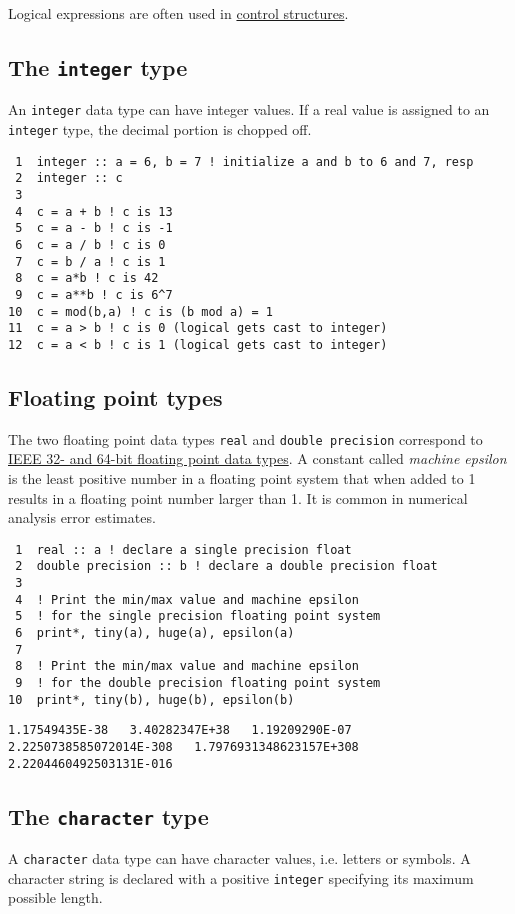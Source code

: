 \documentclass[11pt]{article}
\begin{document}
Logical expressions are often used in \hyperref[sec:orgheadline11]{control structures}.

\subsection{The \texttt{integer} type}
\label{sec:orgheadline13}
An \texttt{integer} data type can have integer values. If a real value is assigned to an \texttt{integer} type, the decimal portion is chopped off.

\begin{verbatim}
 1  integer :: a = 6, b = 7 ! initialize a and b to 6 and 7, resp
 2  integer :: c
 3  
 4  c = a + b ! c is 13
 5  c = a - b ! c is -1
 6  c = a / b ! c is 0
 7  c = b / a ! c is 1
 8  c = a*b ! c is 42
 9  c = a**b ! c is 6^7
10  c = mod(b,a) ! c is (b mod a) = 1
11  c = a > b ! c is 0 (logical gets cast to integer)
12  c = a < b ! c is 1 (logical gets cast to integer)
\end{verbatim}

\subsection{Floating point types}
\label{sec:orgheadline14}
The two floating point data types \texttt{real} and \texttt{double precision} correspond to \href{https://en.wikipedia.org/wiki/IEEE_floating_point}{IEEE 32- and 64-bit floating point data types}. A constant called \emph{machine epsilon} is the least positive number in a floating point system that when added to 1 results in a floating point number larger than 1. It is common in numerical analysis error estimates.

\begin{verbatim}
 1  real :: a ! declare a single precision float
 2  double precision :: b ! declare a double precision float
 3  
 4  ! Print the min/max value and machine epsilon
 5  ! for the single precision floating point system
 6  print*, tiny(a), huge(a), epsilon(a)
 7  
 8  ! Print the min/max value and machine epsilon
 9  ! for the double precision floating point system
10  print*, tiny(b), huge(b), epsilon(b)
\end{verbatim}

\begin{verbatim}
1.17549435E-38   3.40282347E+38   1.19209290E-07
2.2250738585072014E-308   1.7976931348623157E+308   2.2204460492503131E-016
\end{verbatim}

\subsection{The \texttt{character} type}
\label{sec:orgheadline15}
A \texttt{character} data type can have character values, i.e. letters or symbols. A character string is declared with a positive \texttt{integer} specifying its maximum possible length.
\end{document}
